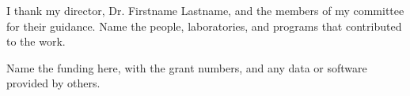 I thank my director, Dr. Firstname Lastname, and the members of my committee for their guidance. Name the people, laboratories, and programs that contributed to the work.

Name the funding here, with the grant numbers, and any data or software provided by others.
